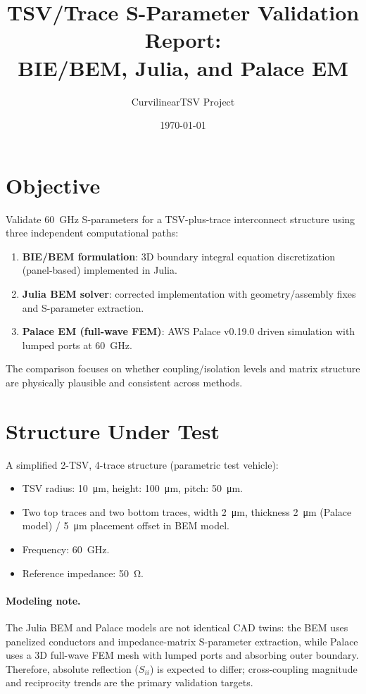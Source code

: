 \documentclass[11pt]{article}
\title{TSV/Trace S-Parameter Validation Report:\\BIE/BEM, Julia, and Palace EM}
\author{CurvilinearTSV Project}
\date{\today}
\begin{document}
\maketitle

\section{Objective}
Validate 60~GHz S-parameters for a TSV-plus-trace interconnect structure using three independent computational paths:
\begin{enumerate}
  \item \textbf{BIE/BEM formulation}: 3D boundary integral equation discretization (panel-based) implemented in Julia.
  \item \textbf{Julia BEM solver}: corrected implementation with geometry/assembly fixes and S-parameter extraction.
  \item \textbf{Palace EM (full-wave FEM)}: AWS Palace v0.19.0 driven simulation with lumped ports at 60~GHz.
\end{enumerate}
The comparison focuses on whether coupling/isolation levels and matrix structure are physically plausible and consistent across methods.

\section{Structure Under Test}
A simplified 2-TSV, 4-trace structure (parametric test vehicle):
\begin{itemize}
  \item TSV radius: \SI{10}{\micro\meter}, height: \SI{100}{\micro\meter}, pitch: \SI{50}{\micro\meter}.
  \item Two top traces and two bottom traces, width \SI{2}{\micro\meter}, thickness \SI{2}{\micro\meter} (Palace model) / \SI{5}{\micro\meter} placement offset in BEM model.
  \item Frequency: \SI{60}{\giga\hertz}.
  \item Reference impedance: \SI{50}{\ohm}.
\end{itemize}

\paragraph{Modeling note.}
The Julia BEM and Palace models are not identical CAD twins: the BEM uses panelized conductors and impedance-matrix S-parameter extraction, while Palace uses a 3D full-wave FEM mesh with lumped ports and absorbing outer boundary. Therefore, absolute reflection ($S_{ii}$) is expected to differ; cross-coupling magnitude and reciprocity trends are the primary validation targets.
\end{document}
